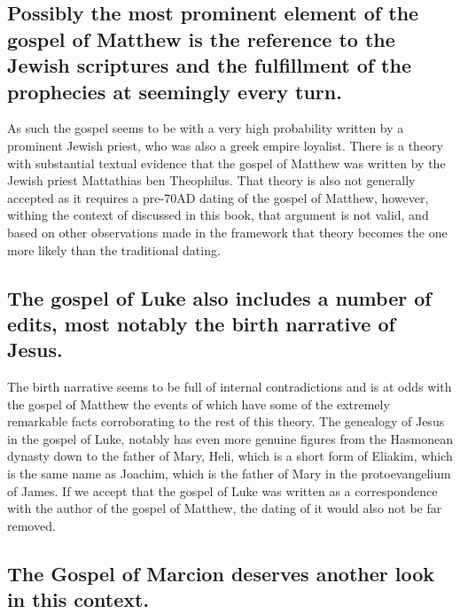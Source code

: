 \subsection{Possibly the most prominent element of the gospel of Matthew is the reference to the Jewish scriptures and the fulfillment of the prophecies at seemingly every turn.}\label{subsec:possibly-the-most-prominent-element-of-the-gospel-of-matthew-is-the-reference-to-the-jewish-scriptures-and-the-fulfillment-of-the-prophecies-at-seemingly-every-turn.}

As such the gospel seems to be with a very high probability written by a prominent Jewish priest, who was also a greek empire loyalist.
There is a theory with substantial textual evidence that the gospel of Matthew was written by the Jewish priest Mattathias ben Theophilus.
That theory is also not generally accepted as it requires a pre-70AD dating of the gospel of Matthew, however, withing the context of discussed in this book, that argument is not valid, and based on other observations made in the framework that theory becomes the one more likely than the traditional dating.

\subsection{The gospel of Luke also includes a number of edits, most notably the birth narrative of Jesus.}\label{subsec:the-gospel-of-luke-also-includes-a-number-of-edits-most-notably-the-birth-narrative-of-jesus.}

The birth narrative seems to be full of internal contradictions and is at odds with the gospel of Matthew the events of which have some of the extremely remarkable facts corroborating to the rest of this theory.
The genealogy of Jesus in the gospel of Luke, notably has even more genuine figures from the Hasmonean dynasty down to the father of Mary, Heli, which is a short form of Eliakim, which is the same name as Joachim, which is the father of Mary in the protoevangelium of James.
If we accept that the gospel of Luke was written as a correspondence with the author of the gospel of Matthew, the dating of it would also not be far removed.

\subsection{The Gospel of Marcion deserves another look in this context.}\label{subsec:the-gospel-of-marcion-deserves-another-look-in-this-context.}

